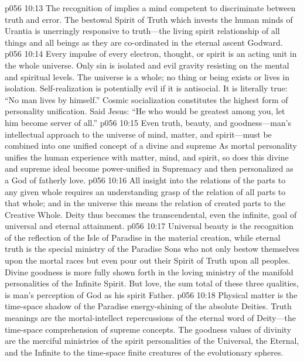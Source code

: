 \pc \vs p056 10:13 The recognition of  implies a mind competent to discriminate between truth and error. The bestowal Spirit of Truth which invests the human minds of Urantia is unerringly responsive to truth---the living spirit relationship of all things and all beings as they are co\hyp{}ordinated in the eternal ascent Godward.
\vs p056 10:14 Every impulse of every electron, thought, or spirit is an acting unit in the whole universe. Only sin is isolated and evil gravity resisting on the mental and spiritual levels. The universe is a whole; no thing or being exists or lives in isolation. Self\hyp{}realization is potentially evil if it is antisocial. It is literally true: “No man lives by himself.” Cosmic socialization constitutes the highest form of personality unification. Said Jesus: \textcolor{ubdarkred}{“He who would be greatest among you, let him become server of all.”}
\vs p056 10:15 Even truth, beauty, and goodness---man’s intellectual approach to the universe of mind, matter, and spirit---must be combined into one unified concept of a divine and supreme  As mortal personality unifies the human experience with matter, mind, and spirit, so does this divine and supreme ideal become power\hyp{}unified in Supremacy and then personalized as a God of fatherly love.
\vs p056 10:16 All insight into the relations of the parts to any given whole requires an understanding grasp of the relation of all parts to that whole; and in the universe this means the relation of created parts to the Creative Whole. Deity thus becomes the transcendental, even the infinite, goal of universal and eternal attainment.
\pc \vs p056 10:17 Universal beauty is the recognition of the reflection of the Isle of Paradise in the material creation, while eternal truth is the special ministry of the Paradise Sons who not only bestow themselves upon the mortal races but even pour out their Spirit of Truth upon all peoples. Divine goodness is more fully shown forth in the loving ministry of the manifold personalities of the Infinite Spirit. But love, the sum total of these three qualities, is man’s perception of God as his spirit Father.\plusone
\vs p056 10:18 Physical matter is the time\hyp{}space shadow of the Paradise energy\hyp{}shining of the absolute Deities. Truth meanings are the mortal\hyp{}intellect repercussions of the eternal word of Deity---the time\hyp{}space comprehension of supreme concepts. The goodness values of divinity are the merciful ministries of the spirit personalities of the Universal, the Eternal, and the Infinite to the time\hyp{}space finite creatures of the evolutionary spheres.
